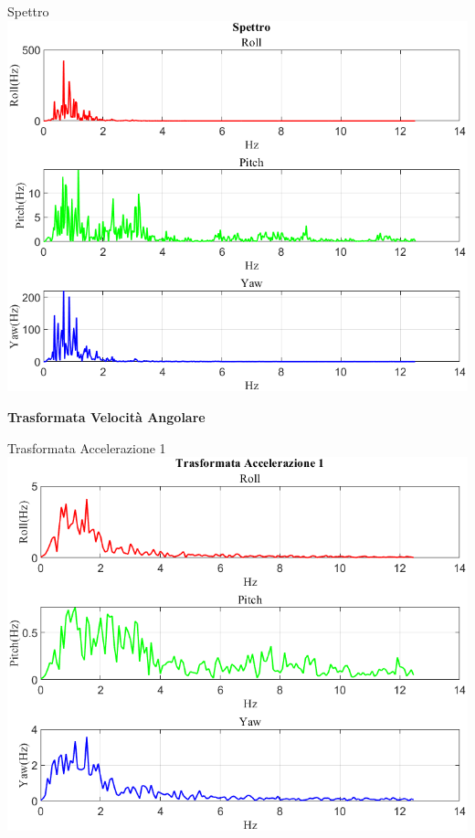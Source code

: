 \documentclass[beamer]{standalone}
\begin{document}
	\begin{frame}{{Spettro}}
		\centering\includegraphics[height=.8\textheight]{figure/VAng/Trasformata/Spettro}
	\end{frame}
	
	\begin{frame}
		\color{blue}\centering\huge{\textbf{Trasformata Velocità Angolare}}
	\end{frame}
	
	\begin{frame}{{Trasformata Accelerazione 1}}
		\centering\includegraphics[height=.8\textheight]{figure/VAng/Trasformata/Trasformata Accelerazione 1}
	\end{frame}
	
\end{document}
